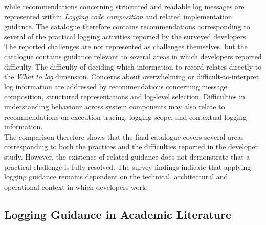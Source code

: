 while recommendations concerning structured and readable log messages are represented within 
\textit{Logging code composition} and related implementation guidance. The catalogue therefore 
contains recommendations corresponding to several of the practical logging activities reported 
by the surveyed developers.
\\
The reported challenges are not represented as challenges themselves, but the catalogue contains 
guidance relevant to several areas in which developers reported difficulty. The difficulty of 
deciding which information to record relates directly to the \textit{What to log} dimension. 
Concerns about overwhelming or difficult-to-interpret log information are addressed by 
recommendations concerning message composition, structured representations and log-level selection. 
Difficulties in understanding behaviour across system components  
may also relate to recommendations on execution tracing, logging scope, and contextual logging information.
\\
The comparison therefore shows that the final catalogue covers several areas corresponding to 
both the practices and the difficulties reported in the developer study. However, the existence 
of related guidance does not demonstrate that a practical challenge is fully resolved. 
The survey findings indicate that applying logging guidance remains dependent on the technical, 
architectural and operational context in which developers work.

\subsection{Logging Guidance in Academic Literature}

